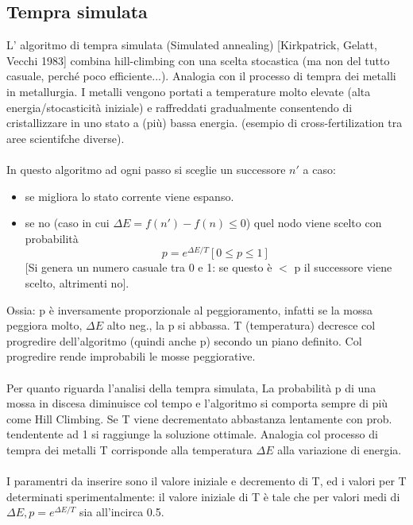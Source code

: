 \subsection{Tempra simulata}
L’ algoritmo di tempra simulata (Simulated annealing) [Kirkpatrick, Gelatt, Vecchi 1983] combina hill-climbing con una scelta stocastica (ma non del tutto casuale, perché poco efficiente...).
Analogia con il processo di tempra dei metalli in metallurgia. I metalli vengono portati a temperature molto elevate (alta
energia/stocasticità iniziale) e raffreddati gradualmente consentendo di cristallizzare in uno stato a (più) bassa energia.
(esempio di cross-fertilization tra aree scientifche diverse).\\\\
In questo algoritmo ad ogni passo si sceglie un successore $n'$ a caso:
\begin{itemize}
    \item se migliora lo stato corrente viene espanso.
    \item se no (caso in cui $\Delta E = f(n') - f(n) \leq 0$) quel nodo viene scelto con probabilità $$p = e^{\Delta E/T} [0 \leq p \leq 1]$$ [Si genera un numero casuale tra 0 e 1: se questo è $<$ p il successore
    viene scelto, altrimenti no].
\end{itemize}
Ossia: p è inversamente proporzionale al peggioramento, infatti se la mossa peggiora molto, $\Delta E$ alto neg., la p si abbassa. 
T (temperatura) decresce col progredire dell’algoritmo (quindi anche p) secondo un piano definito. Col progredire rende improbabili le mosse peggiorative.\\\\
Per quanto riguarda l'analisi della tempra simulata, La probabilità p di una mossa in discesa diminuisce col tempo e l’algoritmo si comporta sempre di più come Hill Climbing.
Se T viene decrementato abbastanza lentamente con prob. tendentente ad 1 si raggiunge la soluzione ottimale. Analogia col processo di tempra dei metalli
T corrisponde alla temperatura $\Delta E$ alla variazione di energia.\\\\
I paramentri da inserire sono il valore iniziale e decremento di T, ed i valori 
per T determinati sperimentalmente: il valore iniziale di T è tale che per valori medi di $\Delta E, p=e^{\Delta E/T}$ sia all’incirca 0.5. 

